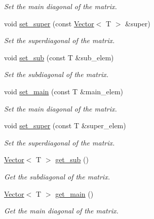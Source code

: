 \begin{DoxyCompactItemize}
\begin{DoxyCompactList}\small\item\em Set the main diagonal of the matrix. \end{DoxyCompactList}\item 
void \hyperlink{classLuna_1_1Tridiagonal_a875d22427ef3a88accb530fe9806bfa4}{set\+\_\+super} (const \hyperlink{classLuna_1_1Vector}{Vector}$<$ T $>$ \&super)
\begin{DoxyCompactList}\small\item\em Set the superdiagonal of the matrix. \end{DoxyCompactList}\item 
void \hyperlink{classLuna_1_1Tridiagonal_a288b97194054318128a096aac12a7eef}{set\+\_\+sub} (const T \&sub\+\_\+elem)
\begin{DoxyCompactList}\small\item\em Set the subdiagonal of the matrix. \end{DoxyCompactList}\item 
void \hyperlink{classLuna_1_1Tridiagonal_a2c333c2bd6de2d9432a2325979240c93}{set\+\_\+main} (const T \&main\+\_\+elem)
\begin{DoxyCompactList}\small\item\em Set the main diagonal of the matrix. \end{DoxyCompactList}\item 
void \hyperlink{classLuna_1_1Tridiagonal_a956689dcbe76a4b23fa10192a7e1a8f9}{set\+\_\+super} (const T \&super\+\_\+elem)
\begin{DoxyCompactList}\small\item\em Set the superdiagonal of the matrix. \end{DoxyCompactList}\item 
\hyperlink{classLuna_1_1Vector}{Vector}$<$ T $>$ \hyperlink{classLuna_1_1Tridiagonal_a00675dffdb07936a5252d2a32ca3d983}{get\+\_\+sub} ()
\begin{DoxyCompactList}\small\item\em Get the subdiagonal of the matrix. \end{DoxyCompactList}\item 
\hyperlink{classLuna_1_1Vector}{Vector}$<$ T $>$ \hyperlink{classLuna_1_1Tridiagonal_ac95e35aacc68963b5889f0cf6c838315}{get\+\_\+main} ()
\begin{DoxyCompactList}\small\item\em Get the main diagonal of the matrix. \end{DoxyCompactList}\item 

\end{DoxyCompactItemize}

